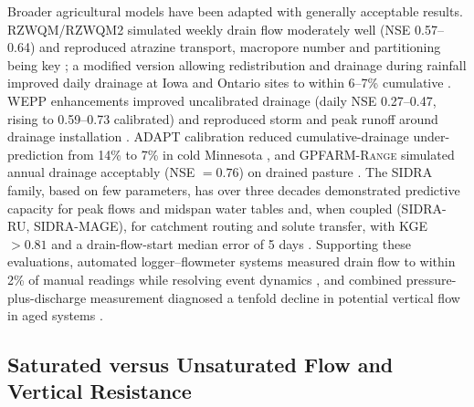 \documentclass[11pt]{article}
\begin{document}
Broader agricultural models have been adapted with generally acceptable results. \textsc{RZWQM}/\textsc{RZWQM2} simulated weekly drain flow moderately well (NSE 0.57--0.64) and reproduced atrazine transport, macropore number and partitioning being key \parencite{Malone2014,Singh1996}; a modified version allowing redistribution and drainage during rainfall improved daily drainage at Iowa and Ontario sites to within 6--7\% cumulative \parencite{Xian2017}. \textsc{WEPP} enhancements improved uncalibrated drainage (daily NSE 0.27--0.47, rising to 0.59--0.73 calibrated) and reproduced storm and peak runoff around drainage installation \parencite{RevueltaAcosta2021,SAVABI1993}. \textsc{ADAPT} calibration reduced cumulative-drainage under-prediction from 14\% to 7\% in cold Minnesota \parencite{Mendez2004}, and \textsc{GPFARM-Range} simulated annual drainage acceptably (NSE $=0.76$) on drained pasture \parencite{Chen2016}. The \textsc{SIDRA} family, based on few parameters, has over three decades demonstrated predictive capacity for peak flows and midspan water tables and, when coupled (\textsc{SIDRA-RU}, \textsc{SIDRA-MAGE}), for catchment routing and solute transfer, with KGE $>0.81$ and a drain-flow-start median error of 5 days \parencite{Zimmer2023,Henine2022,LESAFFRE1988,Giraud1997}. Supporting these evaluations, automated logger--flowmeter systems measured drain flow to within 2\% of manual readings while resolving event dynamics \parencite{Kanwar1999}, and combined pressure-plus-discharge measurement diagnosed a tenfold decline in potential vertical flow in aged systems \parencite{Nishida2020,Gurklys2008}.

\subsection{Saturated versus Unsaturated Flow and Vertical Resistance}
\end{document}
